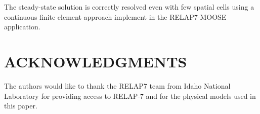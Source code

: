 \documentclass[12pt]{article}
\begin{document}
The steady-state solution is correctly resolved even with few spatial cells using a continuous finite element approach implement in the RELAP7-MOOSE application.

%
\section*{ACKNOWLEDGMENTS}

The authors would like to thank the RELAP7 team from Idaho National Laboratory for providing access to RELAP-7 and for the physical models used in this paper. 

%
%
%
%
%
\end{document}
